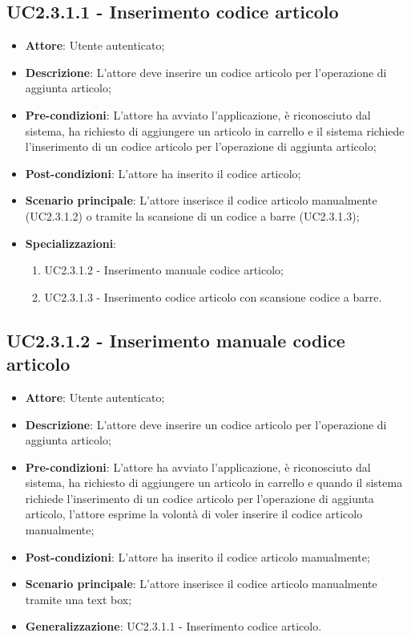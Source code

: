 \subsection{UC2.3.1.1 - Inserimento codice articolo}

\begin{itemize}
	\item \textbf{Attore}: Utente autenticato;
	\item \textbf{Descrizione}: L'attore deve inserire un codice articolo per l'operazione di aggiunta articolo;
	\item \textbf{Pre-condizioni}: L'attore ha avviato l'applicazione, è riconosciuto dal sistema, ha richiesto di aggiungere un articolo in carrello e il sistema richiede l'inserimento di un codice articolo per l'operazione di aggiunta articolo;
	\item \textbf{Post-condizioni}: L'attore ha inserito il codice articolo;
	\item \textbf{Scenario principale}: L'attore inserisce il codice articolo manualmente (UC2.3.1.2) o tramite la scansione di un codice a barre (UC2.3.1.3);
	\item \textbf{Specializzazioni}: 
		\begin{enumerate}
			\item UC2.3.1.2 - Inserimento manuale codice articolo;
			\item UC2.3.1.3 - Inserimento codice articolo con scansione codice a barre.
		\end{enumerate}		 
\end{itemize}

\subsection{UC2.3.1.2 - Inserimento manuale codice articolo}

\begin{itemize}
	\item \textbf{Attore}: Utente autenticato;
	\item \textbf{Descrizione}: L'attore deve inserire un codice articolo per l'operazione di aggiunta articolo;
	\item \textbf{Pre-condizioni}: L'attore ha avviato l'applicazione, è riconosciuto dal sistema, ha richiesto di aggiungere un articolo in carrello e quando il sistema richiede l'inserimento di un codice articolo per l'operazione di aggiunta articolo, l'attore esprime la volontà di voler inserire il codice articolo manualmente;
	\item \textbf{Post-condizioni}: L'attore ha inserito il codice articolo manualmente;
	\item \textbf{Scenario principale}: L'attore inserisce il codice articolo manualmente tramite una text box;
	\item \textbf{Generalizzazione}: UC2.3.1.1 - Inserimento codice articolo.
\end{itemize}

